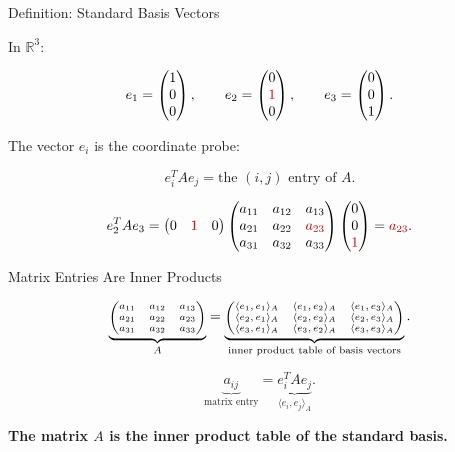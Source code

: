 \documentclass[10pt]{beamer}
\theoremstyle{definition}
\newcommand{\x}[1]{\alert{\textbf{#1}}}
\newcommand{\rd}[1]{{\color{red!70!black}#1}}
\begin{document}
\begin{frame}{Definition: Standard Basis Vectors}

In $\mathbb R^3$:

$$
e_1=\begin{pmatrix}1\\0\\0\end{pmatrix},
\qquad
e_2=\begin{pmatrix}0\\\rd{1}\\0\end{pmatrix},
\qquad
e_3=\begin{pmatrix}0\\0\\1\end{pmatrix}.
$$

\vfill

The vector $e_i$ is the coordinate probe:

$$
e_i^T A e_j=\text{the }(i,j)\text{ entry of }A.
$$

\vfill

\[
e_2^TAe_3
=
\begin{pmatrix}0&\rd{1}&0\end{pmatrix}
\begin{pmatrix}
a_{11}&a_{12}&a_{13}\\
a_{21}&a_{22}&\rd{a_{23}}\\
a_{31}&a_{32}&a_{33}
\end{pmatrix}
\begin{pmatrix}0\\0\\\rd{1}\end{pmatrix}
=\rd{a_{23}}.
\]

\end{frame}


\begin{frame}{Matrix Entries Are Inner Products}

\[
\scriptsize
\underbrace{
\begin{pmatrix}
a_{11}&a_{12}&a_{13}\\
a_{21}&a_{22}&a_{23}\\
a_{31}&a_{32}&a_{33}
\end{pmatrix}}_{A}
=
\underbrace{
\begin{pmatrix}
\langle e_1,e_1\rangle_A&\langle e_1,e_2\rangle_A&\langle e_1,e_3\rangle_A\\
\langle e_2,e_1\rangle_A&\langle e_2,e_2\rangle_A&\langle e_2,e_3\rangle_A\\
\langle e_3,e_1\rangle_A&\langle e_3,e_2\rangle_A&\langle e_3,e_3\rangle_A
\end{pmatrix}}_{\text{inner product table of basis vectors}}.
\]

\vfill

\[
\boxed{\underbrace{a_{ij}}_{\text{matrix entry}}
=
\underbrace{e_i^TAe_j}_{\langle e_i,e_j\rangle_A}.}
\]

\vfill

\begin{center}
\x{The matrix $A$ is the inner product table of the standard basis.}
\end{center}

\end{frame}
\end{document}
